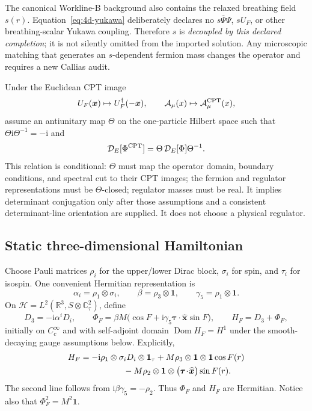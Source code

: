 \documentclass[11pt]{article}
\theoremstyle{definition}
\theoremstyle{remark}
\newcommand{\ii}{\mathrm i}
\newcommand{\CC}{\mathbb C}
\newcommand{\RR}{\mathbb R}
\newcommand{\cH}{\mathcal H}
\begin{document}
The canonical Workline-B background also contains the relaxed breathing
field \(s(r)\).  Equation~\eqref{eq:4d-yukawa} deliberately declares no
\(s\overline\Psi\Psi\), \(sU_F\), or other breathing-scalar Yukawa coupling.
Therefore \(s\) is \emph{decoupled by this declared completion}; it is not
silently omitted from the imported solution.  Any microscopic matching that
generates an \(s\)-dependent fermion mass changes the operator and requires a
new Callias audit.

Under the Euclidean CPT image
\begin{equation}
 U_F(\bm x)\mapsto U_F^\dagger(-\bm x),\qquad
 \mathcal A_\mu(x)\mapsto\mathcal A_\mu^{\rm CPT}(x),
 \label{eq:cpt-fields}
\end{equation}
assume an antiunitary map \(\Theta\) on the one-particle Hilbert space such
that \(\Theta\ii\Theta^{-1}=-\ii\) and
\begin{equation}
 \mathcal D_E[\Phi^{\rm CPT}]
 =\Theta\,\mathcal D_E[\Phi]\Theta^{-1}.
 \label{eq:cpt-operator}
\end{equation}
This relation is conditional: \(\Theta\) must map the operator domain,
boundary conditions, and spectral cut to their CPT images; the fermion and
regulator representations must be \(\Theta\)-closed; regulator masses must be
real.  It implies determinant conjugation only after those assumptions and a
consistent determinant-line orientation are supplied.  It does not choose a
physical regulator.

\subsection{Static three-dimensional Hamiltonian}

Choose Pauli matrices \(\rho_i\) for the upper/lower Dirac block,
\(\sigma_i\) for spin, and \(\tau_i\) for isospin.  One convenient Hermitian
representation is
\begin{equation}
 \alpha_i=\rho_1\otimes\sigma_i,\qquad
 \beta=\rho_3\otimes\bm1,\qquad
 \gamma_5=\rho_1\otimes\bm1.
 \label{eq:gamma-rep}
\end{equation}
On
\(\cH=L^2(\RR^3,S\otimes\CC^2_\tau)\), define
\begin{equation}
 D_3=-\ii\alpha^iD_i,
 \qquad
 \Phi_F=\beta M\bigl(\cos F
 +\ii\gamma_5\bm\tau\!\cdot\!\widehat{\bm x}\sin F\bigr),
 \qquad H_F=D_3+\Phi_F,
 \label{eq:dirac-potential-split}
\end{equation}
initially on \(C_c^\infty\) and with self-adjoint domain
\(\operatorname{Dom}H_F=H^1\) under the smooth-decaying gauge assumptions
below.  Explicitly,
\begin{align}
 H_F
 &=-\ii\rho_1\otimes\sigma_iD_i\otimes\bm1_\tau
 +M\rho_3\otimes\bm1\otimes\bm1\cos F(r)\notag\\
 &\hspace{18mm}
 -M\rho_2\otimes\bm1\otimes
 \bigl(\bm\tau\!\cdot\!\widehat{\bm x}\bigr)\sin F(r).
 \label{eq:static-hamiltonian}
\end{align}
The second line follows from
\(\ii\beta\gamma_5=-\rho_2\).  Thus \(\Phi_F\) and \(H_F\) are Hermitian.
Notice also that \(\Phi_F^2=M^2\bm1\).
\end{document}

